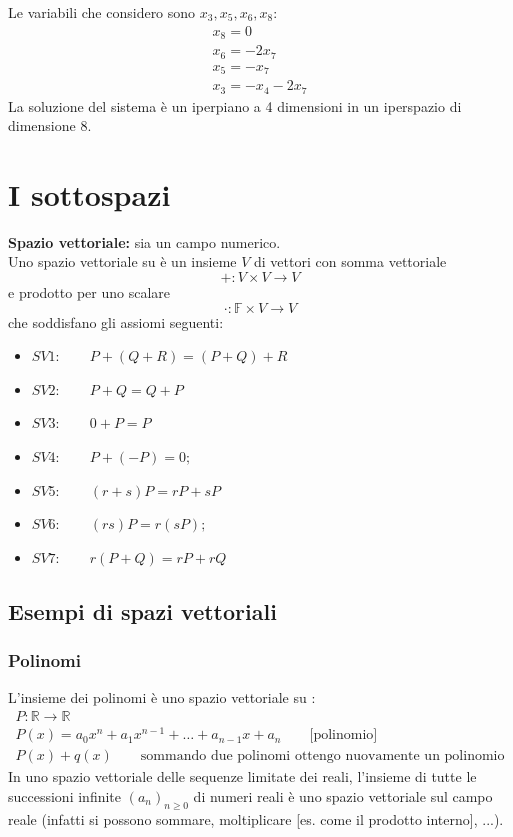 \documentclass[italian]{article}
\newcommand{\ins}[1]{\text{$\mathbb{#1}$}}
\begin{document}
Le variabili che considero sono $x_3, x_5, x_6, x_8$:
\begin{gather*}
	x_8 = 0 \\
	x_6 = -2x_7 \\
	x_5 = -x_7 \\
	x_3 = -x_4 - 2x_7
\end{gather*}
La soluzione del sistema è un iperpiano a 4 dimensioni in un iperspazio di dimensione 8.

\newpage
\section{I sottospazi}
\textbf{Spazio vettoriale:} sia \ins{F} un campo numerico.\\Uno spazio vettoriale su \ins{F} è un insieme $V$ di vettori con somma vettoriale \[+ : V \times V \to V\] e prodotto per uno scalare \[\cdot : \mathbb{F} \times V \to V \]
che soddisfano gli assiomi seguenti:
\begin{itemize}
	\item $SV1: \qquad P + (Q + R) = (P + Q) + R$
	\item $SV2: \qquad P + Q = Q + P$
	\item $SV3: \qquad 0 + P = P$
	\item $SV4: \qquad P + (-P ) = 0;$
	\item $SV5: \qquad (r + s)P = rP + sP$
	\item $SV6: \qquad (rs)P = r(sP );$
	\item $SV7: \qquad r(P + Q) = rP + rQ$
\end{itemize}
\subsection{Esempi di spazi vettoriali}
\subsubsection{Polinomi}
L'insieme dei polinomi è uno spazio vettoriale su \ins{R}:
\begin{gather*}
	P: \ins{R} \to \ins{R} \\
	P(x) = a_0x^n + a_1x^{n-1} + \ldots + a_{n-1}x + a_n \qquad \text{[polinomio]}\\
	P(x) + q(x) \qquad \text{sommando due polinomi ottengo nuovamente un polinomio}
\end{gather*}
In uno spazio vettoriale delle sequenze limitate dei reali, l'insieme di tutte le successioni infinite $(a_n)_{n\geq0}$ di numeri reali è uno spazio vettoriale sul campo reale (infatti si possono sommare, moltiplicare [es. come il prodotto interno], ...).
\end{document}
